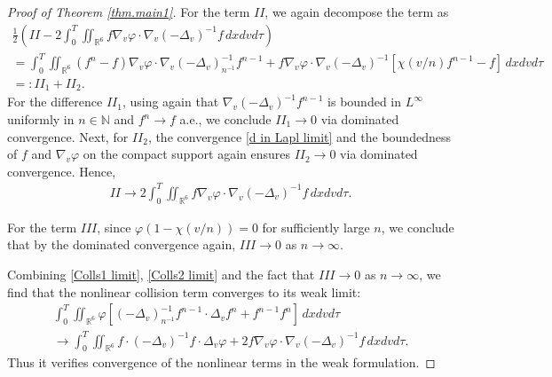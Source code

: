 \documentclass[reqno,11pt,final]{amsart}
\theoremstyle{plain}
\numberwithin{equation}{section}
\numberwithin{theorem}{section}
\begin{document}
\begin{proof}[Proof of Theorem \ref{thm.main1}]
For the term $II$, we again decompose the term as 
\begin{multline*}
\frac{1}{2}\left(II- 2\int_0^T \iint_{\mathbb{R}^6}f\nabla_v\varphi\cdot\nabla_v(-\Delta_v)^{-1}f\,dxdvd\tau\right) \\
= \int_0^T \iint_{\mathbb{R}^6} (f^n - f)\nabla_v\varphi\cdot\nabla_v(-\Delta_v)_{n^{-1}}^{-1}f^{n-1} + f\nabla_v\varphi\cdot\nabla_v(-\Delta_v)^{-1}[\chi(v/n)f^{n-1}-f]\,dxdvd\tau\\
=: II_1 + II_2.
\end{multline*}For the difference $II_1$, using again that $\nabla_v(-\Delta_v)^{-1}f^{n-1}$ is bounded in $L^\infty$ uniformly in $n\in\mathbb{N}$ and $f^n \to f$ a.e., we conclude $II_1\to0$ via dominated convergence. Next, for $II_2$, the convergence \eqref{d in Lapl limit} and the boundedness of $f$ and $\nabla_v\varphi$ on the compact support again ensures $II_2\to0$ via dominated convergence. Hence,
\begin{align}\label{Colls2 limit}
II \to 2\int_0^T\iint_{\mathbb{R}^6} f\nabla_v\varphi\cdot\nabla_v(-\Delta_v)^{-1}f\,dxdvd\tau.
\end{align}

For the term $III$, since $\varphi(1-\chi(v/n))= 0$ for sufficiently large $n$, we conclude that by the dominated convergence again, $III\to0$ as $n\to\infty$.

Combining \eqref{Colls1 limit}, \eqref{Colls2 limit} and the fact that $III\to0$ as $n\to\infty$, we find that the nonlinear collision term converges to its weak limit:
\begin{multline*}
\int_0^T\iint_{\mathbb{R}^6} \varphi\left[(-\Delta_v)_{n^{-1}}^{-1}f^{n-1}\cdot\Delta_vf^n + f^{n-1}f^n\right]\,dxdvd\tau\\
\to\int_0^T \iint_{\mathbb{R}^6} f\cdot(-\Delta_v)^{-1}f\cdot\Delta_v\varphi + 2f\nabla_v\varphi\cdot\nabla_v(-\Delta_v)^{-1}f\,dxdvd\tau.
\end{multline*}Thus it verifies convergence of the nonlinear terms in the weak formulation.


\end{proof}
\end{document}
